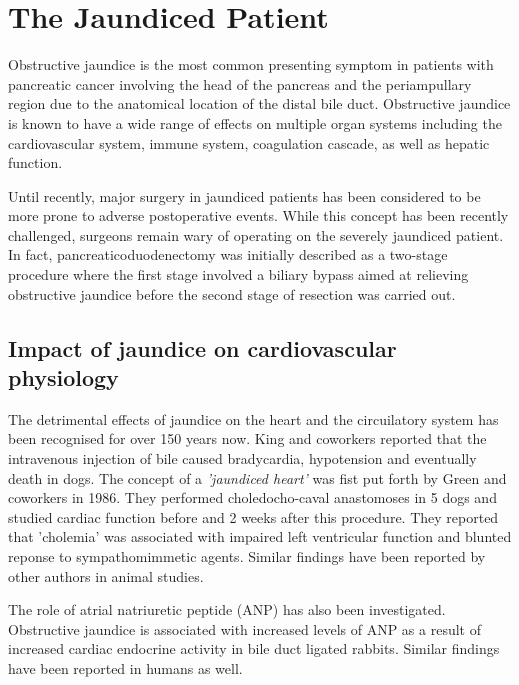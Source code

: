 \section{The Jaundiced Patient}

Obstructive jaundice is the most common presenting symptom in patients with pancreatic cancer involving the head of the pancreas and the periampullary region due to the anatomical location of the distal bile duct. Obstructive jaundice is known to have a wide range of effects on multiple organ systems including the cardiovascular system, immune system, coagulation cascade, as well as hepatic function.

Until recently, major surgery in jaundiced patients has been considered to be more prone to adverse postoperative events. While this concept has been recently challenged, surgeons remain wary of operating on the severely jaundiced patient. In fact, pancreaticoduodenectomy was initially described as a two-stage procedure where the first stage involved a biliary bypass aimed at relieving obstructive jaundice before the second stage of resection was carried out.


\subsection{Impact of jaundice on cardiovascular physiology}

The detrimental effects of jaundice on the heart and the circuilatory system has been recognised for over 150 years now. King and coworkers reported that the intravenous injection of bile caused bradycardia, hypotension and eventually death in dogs.\parencite{king_effect_1909} The concept of a \textit{'jaundiced heart'} was fist put forth by Green and coworkers in 1986.\parencite{green_jaundiced_1986} They performed choledocho-caval anastomoses in 5 dogs and studied cardiac function before and 2 weeks after this procedure. They reported that 'cholemia' was associated with impaired left ventricular function and blunted reponse to sympathomimmetic agents. Similar findings have been reported by other authors in animal studies. \parencite{binah_obstructive_1985,bomzon_systemic_1986}

The role of atrial natriuretic peptide (ANP) has also been investigated. Obstructive jaundice is associated with increased levels of ANP as a result of increased cardiac endocrine activity in bile duct ligated rabbits.\parencite{pereira_increased_1994} Similar findings have been reported in humans as well. \parencite{gallardo_increased_1998, martinez-rodenas_circulating_1998}

